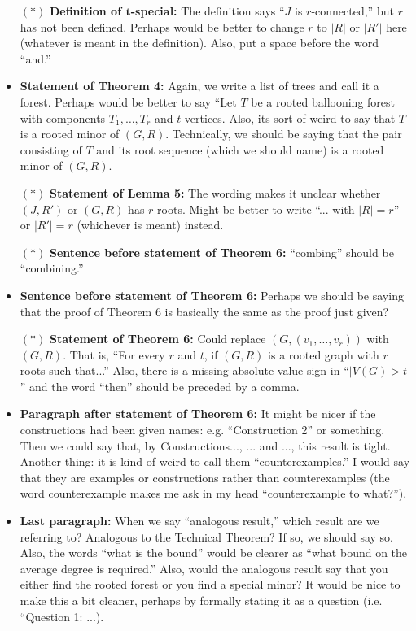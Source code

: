 \documentclass[11 pt]{article}
\begin{document}
\begin{itemize}
\item[$\boldsymbol{(*)}$] \textbf{Definition of $\boldsymbol{t}$-special:} The definition says ``$J$ is $r$-connected,'' but $r$ has not been defined. Perhaps would be better to change $r$ to $|R|$ or $|R'|$ here (whatever is meant in the definition). Also, put a space before the word ``and.''
\item \textbf{Statement of Theorem 4:} Again, we write a list of trees and call it a forest. Perhaps would be better to say ``Let $T$ be a rooted ballooning forest with components $T_1,\dots, T_r$ and $t$ vertices. Also, its sort of weird to say that $T$ is a rooted minor of $(G,R)$. Technically, we should be saying that the pair consisting of $T$ and its root sequence (which we should name) is a rooted minor of $(G,R)$.
\item[$\boldsymbol{(*)}$] \textbf{Statement of Lemma 5:} The wording makes it unclear whether $(J,R')$ or $(G,R)$ has $r$ roots. Might be better to write ``... with $|R|=r$'' or $|R'|=r$ (whichever is meant) instead.
\item[$\boldsymbol{(*)}$] \textbf{Sentence before statement of Theorem 6:} ``combing'' should be ``combining.''
\item \textbf{Sentence before statement of Theorem 6:} Perhaps we should be saying that the proof of Theorem 6 is basically the same as the proof just given? 
\item[$\boldsymbol{(*)}$] \textbf{Statement of Theorem 6:} Could replace $(G,(v_1,\dots,v_r))$ with $(G,R)$. That is, ``For every $r$ and $t$, if $(G,R)$ is a rooted graph with $r$ roots such that...'' Also, there is a missing absolute value sign in ``$|V(G) > t$'' and the word ``then'' should be preceded by a comma.
\item \textbf{Paragraph after statement of Theorem 6:} It might be nicer if the constructions had been given names: e.g. ``Construction 2'' or something. Then we could say that, by Constructions..., ... and ..., this result is tight. Another thing: it is kind of weird to call them ``counterexamples.'' I would say that they are examples or constructions rather than counterexamples (the word counterexample makes me ask in my head ``counterexample to what?'').
\item \textbf{Last paragraph:} When we say ``analogous result,'' which result are we referring to? Analogous to the Technical Theorem? If so, we should say so. Also, the words ``what is the bound'' would be clearer as ``what bound on the average degree is required.'' Also, would the analogous result say that you either find the rooted forest or you find a special minor? It would be nice to make this a bit cleaner, perhaps by formally stating it as a question (i.e. ``Question 1: ...).
\end{itemize}
\end{document}
